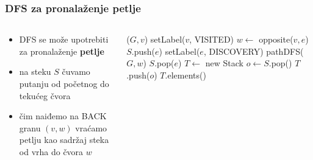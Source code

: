 \documentclass[compress,aspectratio=169]{beamer}
\begin{document}
\begin{frame}[fragile,shrink=3]
  \frametitle{DFS za pronalaženje petlje}
  {\footnotesize
  \begin{columns}
    \begin{column}[t]{8cm}
      \begin{itemize}
        \item DFS se može upotrebiti za pronalaženje \textbf{petlje} 
        \item na steku $S$ čuvamo putanju od početnog do tekućeg čvora
        \item čim naiđemo na {\scriptsize BACK} granu $(v,w)$ vraćamo
          petlju kao sadržaj steka od vrha do čvora $w$
      \end{itemize}
    \end{column}
    \begin{column}[t]{8cm}
      \begin{algorithmic}
        \STATE {}($G,v$)
        \STATE setLabel($v$, {\scriptsize VISITED})
            \STATE $w \leftarrow$ opposite($v,e$)
            \STATE $S$.push($e$)
              \STATE setLabel($e$, {\scriptsize DISCOVERY})
              \STATE pathDFS($G, w$)
              \STATE $S$.pop($e$)
            \ELSE
              \STATE $T \leftarrow$ new Stack
              \REPEAT
                \STATE $o \leftarrow S$.pop()
                \STATE $T$.push($o$)
              \RETURN $T$.elements()
            \ENDIF
          \ENDIF
        \ENDFOR
      \end{algorithmic}
    \end{column}
  \end{columns}
  }
\end{frame}
\end{document}
